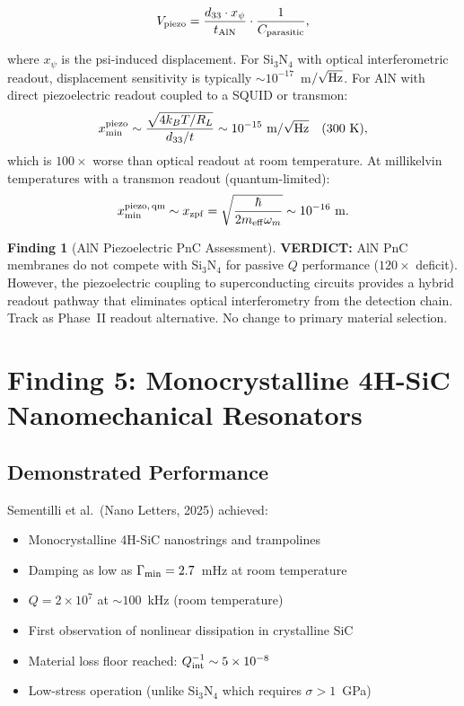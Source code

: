 \documentclass[11pt]{article}
\theoremstyle{definition}
\newtheorem{finding}[theorem]{Finding}
\theoremstyle{remark}
\newcommand{\ee}[1]{\times 10^{#1}}
\newcommand{\verdict}[1]{\textcolor{green!50!black}{\textbf{VERDICT:} #1}}
\begin{document}
\begin{equation}
V_{\rm piezo} = \frac{d_{33} \cdot x_\psi}{t_{\rm AlN}}
\cdot \frac{1}{C_{\rm parasitic}},
\label{eq:v_piezo}
\end{equation}

where $x_\psi$ is the psi-induced displacement. For Si$_3$N$_4$ with
optical interferometric readout, displacement sensitivity is typically
$\sim 10^{-17}$~m$/\sqrt{\rm Hz}$. For AlN with direct piezoelectric
readout coupled to a SQUID or transmon:
\begin{equation}
x_{\rm min}^{\rm piezo} \sim \frac{\sqrt{4 k_B T / R_L}}{d_{33}/t}
\sim 10^{-15}~\text{m}/\sqrt{\text{Hz}} \quad (300~\text{K}),
\label{eq:x_min_piezo}
\end{equation}
which is $100\times$ worse than optical readout at room temperature.
At millikelvin temperatures with a transmon readout (quantum-limited):
\begin{equation}
x_{\rm min}^{\rm piezo,\,qm} \sim x_{\rm zpf}
= \sqrt{\frac{\hbar}{2 m_{\rm eff} \omega_m}}
\sim 10^{-16}~\text{m}.
\label{eq:x_zpf}
\end{equation}

\begin{finding}[AlN Piezoelectric PnC Assessment]
\label{find:aln}
\verdict{AlN PnC membranes do not compete with Si$_3$N$_4$ for
passive $Q$ performance ($120\times$ deficit). However, the
piezoelectric coupling to superconducting circuits provides a
hybrid readout pathway that eliminates optical interferometry
from the detection chain. Track as Phase~II readout alternative.
No change to primary material selection.}
\end{finding}


\section{Finding 5: Monocrystalline 4H-SiC Nanomechanical Resonators}
\label{sec:sic}

\subsection{Demonstrated Performance}

Sementilli et al.\ (Nano Letters, 2025) achieved:
\begin{itemize}[nosep]
\item Monocrystalline 4H-SiC nanostrings and trampolines
\item Damping as low as $\Gamma_{\rm min} = 2.7$~mHz at room temperature
\item $Q = 2\ee{7}$ at $\sim 100$~kHz (room temperature)
\item First observation of nonlinear dissipation in crystalline SiC
\item Material loss floor reached: $Q_{\rm int}^{-1} \sim 5\ee{-8}$
\item Low-stress operation (unlike Si$_3$N$_4$ which requires
  $\sigma > 1$~GPa)
\end{itemize}
\end{document}
